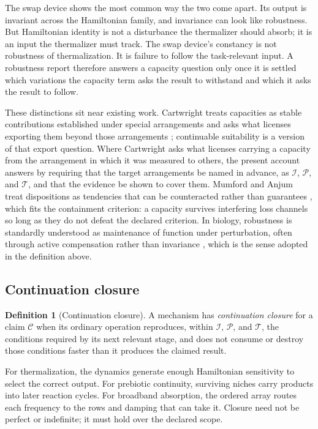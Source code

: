 \documentclass[11pt]{article}
\theoremstyle{definition}
\newtheorem{definition}{Definition}
\newcommand{\Iset}{\mathcal I}
\newcommand{\Pset}{\mathcal P}
\newcommand{\Tset}{\mathcal T}
\newcommand{\Cclaim}{\mathcal C}
\begin{document}
The swap device shows the most common way the two come apart. Its output is invariant across the Hamiltonian family, and invariance can look like robustness. But Hamiltonian identity is not a disturbance the thermalizer should absorb; it is an input the thermalizer must track. The swap device's constancy is not robustness of thermalization. It is failure to follow the task-relevant input. A robustness report therefore answers a capacity question only once it is settled which variations the capacity term asks the result to withstand and which it asks the result to follow.

These distinctions sit near existing work. Cartwright treats capacities as stable contributions established under special arrangements and asks what licenses exporting them beyond those arrangements \cite{cartwright}; continuable suitability is a version of that export question. Where Cartwright asks what licenses carrying a capacity from the arrangement in which it was measured to others, the present account answers by requiring that the target arrangements be named in advance, as $\Iset$, $\Pset$, and $\Tset$, and that the evidence be shown to cover them. Mumford and Anjum treat dispositions as tendencies that can be counteracted rather than guarantees \cite{mumford}, which fits the containment criterion: a capacity survives interfering loss channels so long as they do not defeat the declared criterion. In biology, robustness is standardly understood as maintenance of function under perturbation, often through active compensation rather than invariance \cite{kitano}, which is the sense adopted in the definition above.

\subsection{Continuation closure}

\begin{definition}[Continuation closure]
A mechanism has \emph{continuation closure} for a claim $\Cclaim$ when its ordinary operation reproduces, within $\Iset$, $\Pset$, and $\Tset$, the conditions required by its next relevant stage, and does not consume or destroy those conditions faster than it produces the claimed result.
\end{definition}

For thermalization, the dynamics generate enough Hamiltonian sensitivity to select the correct output. For prebiotic continuity, surviving niches carry products into later reaction cycles. For broadband absorption, the ordered array routes each frequency to the rows and damping that can take it. Closure need not be perfect or indefinite; it must hold over the declared scope.
\end{document}
